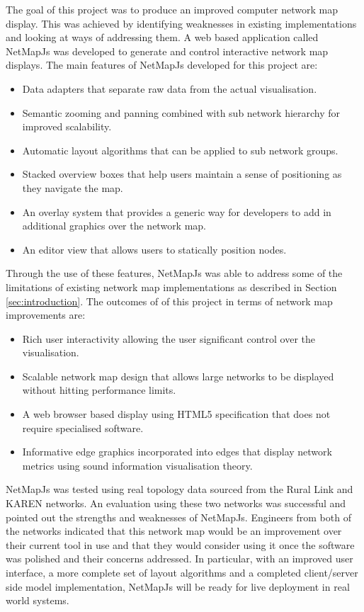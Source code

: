 \documentclass[11pt, a4paper]{article}
\begin{document}
The goal of this project was to produce an improved computer network map
display. This was achieved by identifying weaknesses in existing implementations
and looking at ways of addressing them. A web based application called NetMapJs
was developed to generate and control interactive network map displays. The main
features of NetMapJs developed for this project are:

\begin{itemize}
  \item Data adapters that separate raw data from the actual visualisation.
  \item Semantic zooming and panning combined with sub network hierarchy for
  improved scalability.
  \item Automatic layout algorithms that can be applied to sub network groups.
  \item Stacked overview boxes that help users maintain a sense of positioning
  as they navigate the map.
  \item An overlay system that provides a generic way for developers to add in
  additional graphics over the network map.
  \item An editor view that allows users to statically position nodes.
\end{itemize}

Through the use of these features, NetMapJs was able to address some of the
limitations of existing network map implementations as described in Section
\ref{sec:introduction}. The outcomes of of this project in terms of network map
improvements are:

\begin{itemize}
  \item Rich user interactivity allowing the user significant control over the
  visualisation.
  \item Scalable network map design that allows large networks to be displayed
  without hitting performance limits.
  \item A web browser based display using HTML5 specification that does not 
  require specialised software.
  \item Informative edge graphics incorporated into edges that display
  network metrics using sound information visualisation theory.
\end{itemize}

NetMapJs was tested using real topology data sourced from the Rural Link and
KAREN networks. An evaluation using these two networks was successful and pointed
out the strengths and weaknesses of NetMapJs. Engineers from both of the
networks indicated that this network map would be an improvement over their
current tool in use and that they would consider using it once the software was
polished and their concerns addressed. In particular, with an improved user
interface, a more complete set of layout algorithms and a completed
client/server side model implementation, NetMapJs will be ready for live
deployment in real world systems.
\end{document}
